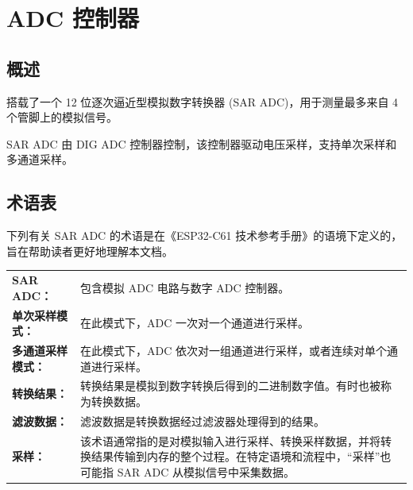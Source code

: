 \documentclass[main\_\_CN.tex]{subfiles}
\begin{document}

\ifglobal
\else
    \listoftodos
    {\let\clearpage\relax \listofdonetodos}
    \tableofcontents
\fi




\hypertarget{adc}{}
\chapter{ADC 控制器}
\label{mod:adc}



\section{概述}

\chipname{} 搭载了一个 12 位逐次逼近型模拟数字转换器 (SAR ADC)，用于测量最多来自 4 个管脚上的模拟信号。

SAR ADC 由 DIG ADC 控制器控制，该控制器驱动电压采样，支持单次采样和多通道采样。

\section{术语表}

下列有关 SAR ADC 的术语是在《ESP32-C61 技术参考手册》的语境下定义的，旨在帮助读者更好地理解本文档。

\begin{longtable}{ R{4cm} p{11cm} }
\textbf{SAR ADC：} & 包含模拟 ADC 电路与数字 ADC 控制器。\\
\textbf{单次采样模式：} & 在此模式下，ADC 一次对一个通道进行采样。 \\
\textbf{多通道采样模式：} & 在此模式下，ADC 依次对一组通道进行采样，或者连续对单个通道进行采样。\\
\textbf{转换结果：} & 转换结果是模拟到数字转换后得到的二进制数字值。有时也被称为转换数据。\\
\textbf{滤波数据：} & 滤波数据是转换数据经过滤波器处理得到的结果。 \\
\textbf{采样：} & 该术语通常指的是对模拟输入进行采样、转换采样数据，并将转换结果传输到内存的整个过程。在特定语境和流程中，“采样”也可能指 SAR ADC 从模拟信号中采集数据。\\
\end{longtable}
\end{document}
